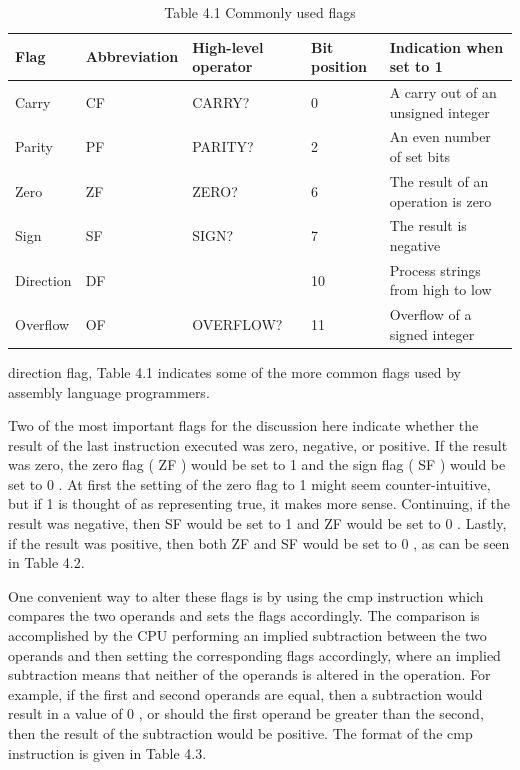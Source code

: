 \documentclass[10pt]{article}
\begin{document}
\begin{table}[h]
\begin{center}
\captionsetup{labelformat=empty}
\caption{Table 4.1 Commonly used flags}
\begin{tabular}{|l|l|l|l|l|}
\hline
Flag & Abbreviation & High-level operator & Bit position & Indication when set to 1 \\
\hline
Carry & CF & CARRY? & 0 & A carry out of an unsigned integer \\
\hline
Parity & PF & PARITY? & 2 & An even number of set bits \\
\hline
Zero & ZF & ZERO? & 6 & The result of an operation is zero \\
\hline
Sign & SF & SIGN? & 7 & The result is negative \\
\hline
Direction & DF &  & 10 & Process strings from high to low \\
\hline
Overflow & OF & OVERFLOW? & 11 & Overflow of a signed integer \\
\hline
\end{tabular}
\end{center}
\end{table}

direction flag, Table 4.1 indicates some of the more common flags used by assembly language programmers.

Two of the most important flags for the discussion here indicate whether the result of the last instruction executed was zero, negative, or positive. If the result was zero, the zero flag ( ZF ) would be set to 1 and the sign flag ( SF ) would be set to 0 . At first the setting of the zero flag to 1 might seem counter-intuitive, but if 1 is thought of as representing true, it makes more sense. Continuing, if the result was negative, then SF would be set to 1 and ZF would be set to 0 . Lastly, if the result was positive, then both ZF and SF would be set to 0 , as can be seen in Table 4.2.

One convenient way to alter these flags is by using the cmp instruction which compares the two operands and sets the flags accordingly. The comparison is accomplished by the CPU performing an implied subtraction between the two operands and then setting the corresponding flags accordingly, where an implied subtraction means that neither of the operands is altered in the operation. For example, if the first and second operands are equal, then a subtraction would result in a value of 0 , or should the first operand be greater than the second, then the result of the subtraction would be positive. The format of the cmp instruction is given in Table 4.3.
\end{document}
